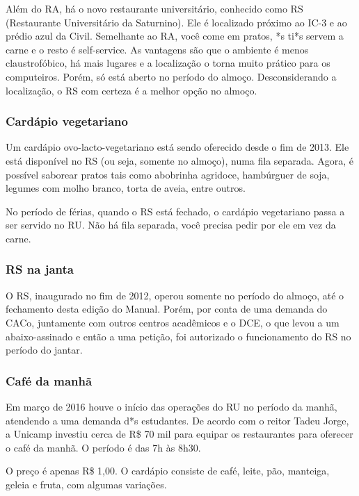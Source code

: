 Além do RA, há o novo restaurante universitário, conhecido como RS (Restaurante
Universitário da Saturnino). Ele é localizado próximo ao IC-3 e ao prédio azul
da Civil. Semelhante ao RA, você come em pratos, *s ti*s servem a carne e o
resto é self-service. As vantagens são que o ambiente é menos claustrofóbico, há
mais lugares e a localização o torna muito prático para os computeiros. Porém,
só está aberto no período do almoço. Desconsiderando a localização, o RS com
certeza é a melhor opção no almoço.

\subsubsection{Cardápio vegetariano}

Um cardápio ovo-lacto-vegetariano está sendo oferecido desde o fim de 2013. Ele
está disponível no RS (ou seja, somente no almoço), numa fila separada. Agora, é
possível saborear pratos tais como abobrinha agridoce, hambúrguer de soja,
legumes com molho branco, torta de aveia, entre outros.

No período de férias, quando o RS está fechado, o cardápio vegetariano passa a
ser servido no RU. Não há fila separada, você precisa pedir por ele em vez da
carne.

\subsubsection{RS na janta}

O RS, inaugurado no fim de 2012, operou somente no período do almoço, até o
fechamento desta edição do Manual. Porém, por conta de uma demanda do CACo,
juntamente com outros centros acadêmicos e o DCE, o que levou a um
abaixo-assinado e então a uma petição, foi autorizado o funcionamento do RS no
período do jantar.

\subsubsection{Café da manhã}

Em março de 2016 houve o início das operações do RU no período da manhã,
atendendo a uma demanda d*s estudantes. De acordo com o reitor Tadeu Jorge, a
Unicamp investiu cerca de R\$ 70 mil para equipar os restaurantes para oferecer
o café da manhã. O período é das 7h às 8h30.

O preço é apenas R\$ 1,00. O cardápio consiste de café, leite, pão, manteiga,
geleia e fruta, com algumas variações.

